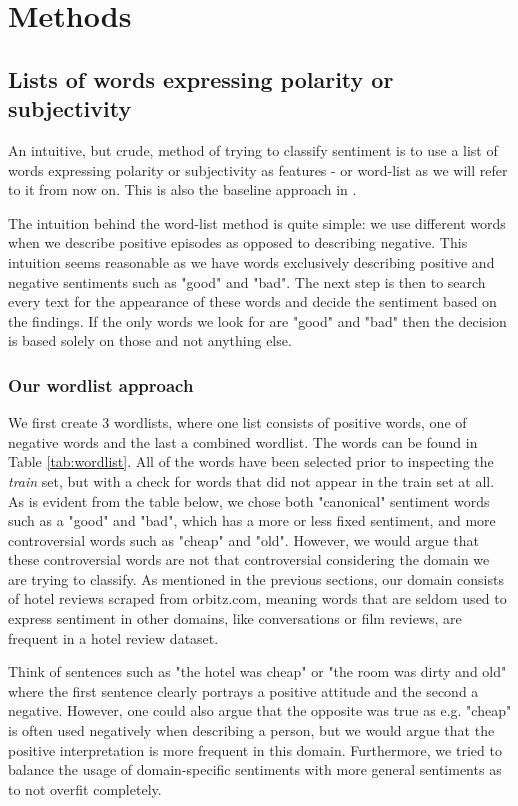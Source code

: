 \documentclass{article}
\begin{document}
\section{Methods}
\subsection{Lists of words expressing polarity or subjectivity}
An intuitive, but crude, method of trying to classify sentiment is to use a list of words expressing polarity or subjectivity as features - or word-list as we will refer to it from now on. This is also the baseline approach in \cite{pangetal}. 

The intuition behind the word-list method is quite simple: we use different words when we describe positive episodes as opposed to describing negative. This intuition seems reasonable as we have words exclusively describing positive and negative sentiments such as "good" and "bad". The next step is then to search every text for the appearance of these words and decide the sentiment based on the findings. If the only words we look for are "good" and "bad" then the decision is based solely on those and not anything else. 

\subsubsection{Our wordlist approach}
We first create 3 wordlists, where one list consists of positive words, one of negative words and the last a combined wordlist. The words can be found in Table \ref{tab:wordlist}. All of the words have been selected prior to inspecting the \textit{train} set, but with a check for words that did not appear in the train set at all. As is evident from the table below, we chose both "canonical" sentiment words such as a "good" and "bad", which has a more or less fixed sentiment, and more controversial words such as "cheap" and "old". However, we would argue that these controversial words are not that controversial considering the domain we are trying to classify. As mentioned in the previous sections, our domain consists of hotel reviews scraped from orbitz.com, meaning words that are seldom used to express sentiment in other domains, like conversations or film reviews, are frequent in a hotel review dataset.

Think of sentences such as "the hotel was cheap" or "the room was dirty and old" where the first sentence clearly portrays a positive attitude and the second a negative.
However, one could also argue that the opposite was true as e.g. "cheap" is often used negatively when describing a person, but we would argue that the positive interpretation is more frequent in this domain. 
Furthermore, we tried to balance the usage of domain-specific sentiments with more general sentiments as to not overfit completely.  
\end{document}
